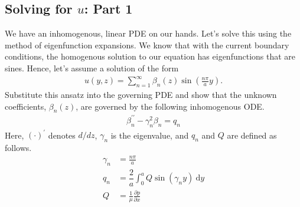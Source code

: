 \documentclass[11pt]{article}
\begin{document}
    \begin{solution}
        
    \end{solution}

    \subsection{Solving for $u$: Part 1}
    We have an inhomogenous, linear PDE on our hands.  Let's solve this using the method of eigenfunction expansions.  We know that with the current boundary conditions, the homogenous solution to our equation has eigenfunctions that are sines. Hence, let's assume a solution of the form
    \begin{align}
      u\left(y, z\right) = \sum_{n=1}^{\infty}{\beta_{n}\left(z\right)\sin\left(\frac{n\pi}{a}y\right)}.
    \end{align}
    Substitute this ansatz into the governing PDE and show that the unknown coefficients, $\beta_{n}\left(z\right)$, are governed by the following inhomogenous ODE.
    \begin{align}
        \beta_{n}^{\prime\prime} - \gamma_{n}^{2}\beta_{n} = q_{n}
        \label{eq:betan}
    \end{align}
    Here, $\left(\cdot\right)^{\prime}$ denotes $d/dz$, $\gamma_n$ is the eigenvalue, and $q_n$ and $Q$ are defined as follows.
    \begin{align}
        \gamma_n &= \frac{n \pi}{a}\\
        q_{n} &= \dfrac{2}{a}\int_{0}^{a}{Q\sin\left(\gamma_{n}y\right)\ \mathrm{d}y}\\
        Q &= \frac{1}{\mu}\frac{\partial p}{\partial x}
    \end{align}
\end{document}
